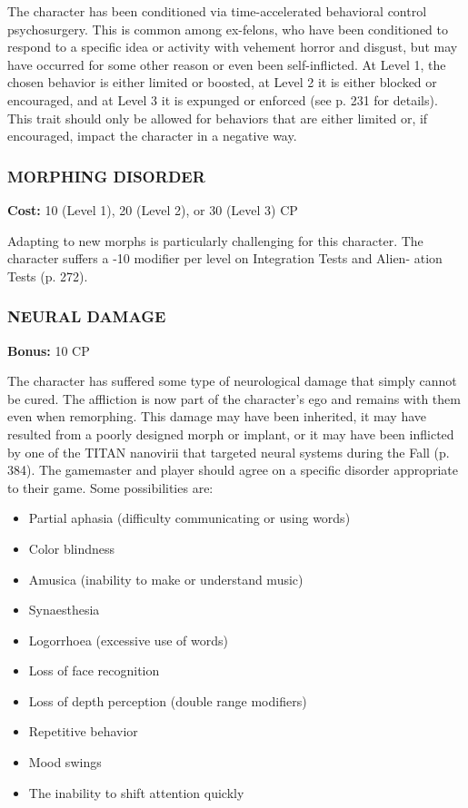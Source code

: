 The character has been conditioned via time-accelerated behavioral control
psychosurgery. This is common among ex-felons, who have been conditioned to
respond to a specific idea or activity with vehement horror and disgust, but
may have occurred for some other reason or even been self-inflicted. At Level
1, the chosen behavior is either limited or boosted, at Level 2 it is either
blocked or encouraged, and at Level 3 it is expunged or enforced (see p. 231
for details). This trait should only be allowed for behaviors that are either
limited or, if encouraged, impact the character in a negative way.

\subsubsection{MORPHING DISORDER}
\textbf{Cost:} 10 (Level 1), 20 (Level 2), or 30 (Level 3) CP

Adapting to new morphs is particularly challenging for this character. The
character suffers a -10 modifier per level on Integration Tests and Alien-
ation Tests (p. 272).

\subsubsection{NEURAL DAMAGE}
\textbf{Bonus:} 10 CP

The character has suffered some type of neurological damage that simply
cannot be cured. The affliction is now part of the character’s ego and remains
with them even when remorphing. This damage may have been inherited, it may
have resulted from a poorly designed morph or implant, or it may have been
inflicted by one of the TITAN nanovirii that targeted neural systems during the
Fall (p. 384). The gamemaster and player should agree on a specific disorder
appropriate to their game. Some possibilities are:

\begin{itemize}
\item Partial aphasia (difficulty communicating or using words)
\item Color blindness
\item Amusica (inability to make or understand music)
\item Synaesthesia
\item Logorrhoea (excessive use of words)
\item Loss of face recognition
\item Loss of depth perception (double range modifiers)
\item Repetitive behavior
\item Mood swings
\item The inability to shift attention quickly
\end{itemize}

